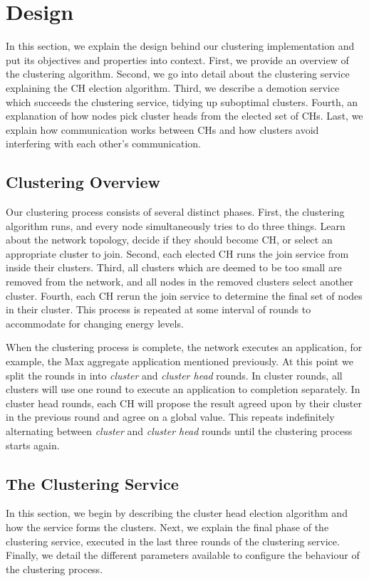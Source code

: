 \chapter{Design}
\label{chap:design}
In this section, we explain the design behind our clustering implementation and put its objectives and properties into context. First, we provide an overview of the clustering algorithm. Second, we go into detail about the clustering service explaining the CH election algorithm. Third, we describe a demotion service which succeeds the clustering service, tidying up suboptimal clusters. Fourth, an explanation of how nodes pick cluster heads from the elected set of CHs. Last, we explain how communication works between CHs and how clusters avoid interfering with each other's communication.

\section{Clustering Overview}
Our clustering process consists of several distinct phases. First, the clustering algorithm runs, and every node simultaneously tries to do three things. Learn about the network topology, decide if they should become CH, or select an appropriate cluster to join. Second, each elected CH runs the join service from \atwo{} inside their clusters. Third, all clusters which are deemed to be too small are removed from the network, and all nodes in the removed clusters select another cluster. Fourth, each CH rerun the join service to determine the final set of nodes in their cluster. This process is repeated at some interval of rounds to accommodate for changing energy levels.

When the clustering process is complete, the network executes an application, for example, the Max aggregate application mentioned previously. At this point we split the rounds in \atwo{} into \emph{cluster} and \emph{cluster head} rounds. In cluster rounds, all clusters will use one round to execute an application to completion separately. In cluster head rounds, each CH will propose the result agreed upon by their cluster in the previous round and agree on a global value. This repeats indefinitely alternating between \emph{cluster} and \emph{cluster head} rounds until the clustering process starts again.

\section{The Clustering Service}
In this section, we begin by describing the cluster head election algorithm and how the service forms the clusters. Next, we explain the final phase of the clustering service, executed in the last three rounds of the clustering service. Finally, we detail the different parameters available to configure the behaviour of the clustering process.


